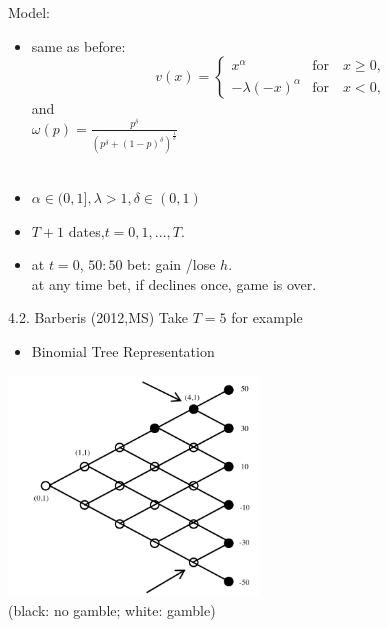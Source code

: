 \documentclass[11pt, aspectratio=169]{beamer}
\begin{document}
\begin{frame}{Model:}
    \begin{itemize}
    \item same as before:
        \begin{equation}
        v(x) = \begin{cases}
            x^\alpha  &  \text{for} \quad x \geq 0,\\
            -\lambda (-x)^\alpha & \text{for} \quad x<0,
            \end{cases}
        \end{equation}\medskip
        and \\
        {\centering $ \omega(p)=\frac{p^\delta }{(p^\delta + (1-p)^\delta)^{\frac{1}{\delta}}} $\\

        }
        \hspace*{\fill} \\ 
    \item $ \alpha \in (0,1], \lambda>1,  \delta \in (0,1) $\\ \medskip
    \item $T+1$ dates,$t=0,1,...,T.$\\ \medskip
    \item at $t=0$, $50:50$ bet: gain /lose $h$.\\
    at any time bet, if declines once, game is over.
    \end{itemize}
\end{frame}

\begin{frame}{4.2. Barberis (2012,MS)}
    Take $T=5$ for example
        \begin{itemize}
            \item  Binomial Tree Representation \medskip
        \end{itemize}
        \includegraphics[width = 0.5\textwidth]{fig2.png}\\
    (black: no gamble; white: gamble)
    \end{frame}
\end{document}
